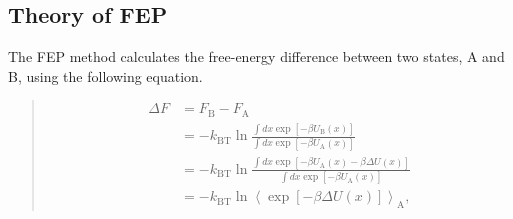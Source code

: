 \documentclass[a4paper,11pt,oneside,english]{sphinxmanual}
\begin{document}
\subsection{Theory of FEP}
\label{\detokenize{20_Alchemy:theory-of-fep}}
The FEP method calculates the free-energy difference between two states, A and B, using the following equation.
\begin{quote}

\vspace{-5mm}
\begin{equation*}
\begin{split}\Delta F &= F_{\text{B}} - F_{\text{A}} \\
    &= -k_{\text{BT}} \ln \frac{\int dx \exp [-\beta U_{\text{B}}(x)]}{\int dx \exp [-\beta U_{\text{A}}(x)]} \\
    &= -k_{\text{BT}} \ln \frac{\int dx \exp [-\beta U_{\text{A}}(x) - \beta \Delta U(x)]}{\int dx \exp [-\beta U_{\text{A}}(x)]} \\
    &= -k_{\text{BT}} \ln \left< \exp [-\beta \Delta U(x)]\right>_{\text{A}},\end{split}
\end{equation*}
\vspace{-3mm}
\end{quote}
\end{document}
